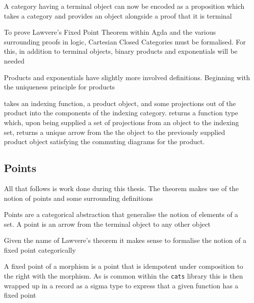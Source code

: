 
A category having a terminal object can now be encoded as a proposition which
takes a category and provides an object alongside a proof that it is terminal


To prove Lawvere's Fixed Point Theorem within Agda and the various surrounding
proofs in logic, Cartesian Closed Categories must be formalised. For this, in
addition to terminal objects, binary products and exponentials will be needed


Products and exponentials have slightly more involved definitions. Beginning
with the uniqueness principle for products


 takes an indexing function, a product object, and some
projections out of the product into the components of the indexing
category.  returns a function type which, upon being
supplied a set of projections from an object to the indexing set, returns a
unique arrow from the the object to the previously supplied product object
satisfying the commuting diagrams for the product.


\subsection{Points} 
All that follows is work done during this thesis. The theorem makes use of the
notion of points and some surrounding definitions

Points are a categorical abstraction that generalise the notion of elements of
a set. A point is an arrow from the terminal object to any other object


Given the name of Lawvere's theorem it makes sense to formalise the notion of a
fixed point categorically


A fixed point of a morphism is a point that is idempotent under composition to
the right with the morphism. As is common within the \verb|cats| library this is
then wrapped up in a record as a sigma type to express that a given function has
a fixed point

